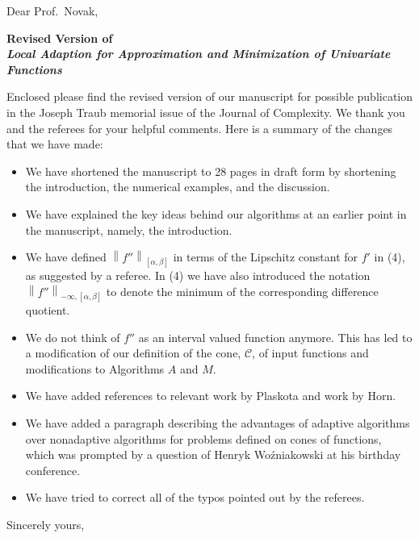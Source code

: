 \documentclass[11pt]{iitletter}
\date{\today}  %
\newcommand{\norm}[2][{}]{\ensuremath{\left \lVert #2 \right \rVert}_{#1}}
\renewcommand{\cc}{\mathcal{C}}
\begin{document}
\begin{letter}{}

\opening{Dear Prof.\ Novak,}

\begin{center} \textbf{ Revised Version of \\
		\emph{Local Adaption for Approximation and 
Minimization of Univariate Functions}} \end{center}
Enclosed please find the revised version of our manuscript for possible publication in the 
Joseph Traub memorial issue of the Journal of Complexity.  We thank you  and the 
referees for your helpful comments.  Here is a summary of the changes that we have 
made:

\begin{itemize}
	\item We have shortened the manuscript to 28 pages in draft form by shortening the 
	introduction, the numerical examples, and the discussion.
	
	\item We have explained the key ideas behind our algorithms at an earlier point in the 
	manuscript, namely, the introduction.
	
	\item We have defined $\norm[{[\alpha,\beta]}]{f''}$ in terms of the Lipschitz constant 
	for $f'$ in (4), as suggested by a referee.  In (4) we have also introduced the notation 
	$\norm[-\infty,{[\alpha,\beta]}]{f''}$ to denote the minimum of the corresponding 
	difference quotient.  
	
	\item We do not think of $f''$ as an interval valued function anymore.  This has led to a 
	modification of our definition of the cone, $\cc$, of input functions and modifications 
	to Algorithms $A$ and $M$.
	
	\item We have added references to relevant work by Plaskota and work by Horn.
	
	\item We have added a paragraph describing the advantages of adaptive algorithms 
	over nonadaptive algorithms for problems defined on cones of functions, which was 
	prompted by a question of Henryk Wo\'zniakowski at his birthday conference.
	
	\item We have tried to correct all of the typos pointed out by the referees.


\end{itemize}


\closing{Sincerely yours,}


%
%
%

\end{letter}
\end{document}
